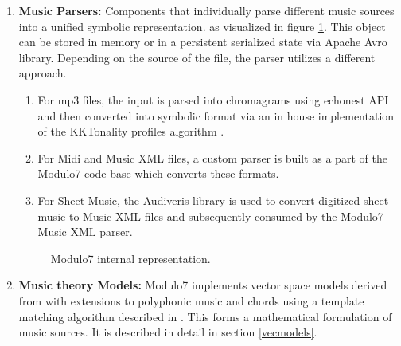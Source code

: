 \documentclass{article}
\begin{document}
\begin{enumerate}
\item \textbf{Music Parsers: } Components that individually parse different music sources into a unified symbolic representation. as visualized in figure \ref{fig:document}. This object can be stored in memory or in a persistent serialized state via Apache Avro library. Depending on the source of the file, the parser utilizes a different approach.
\begin{enumerate}
\item For mp3 files, the input is parsed into chromagrams using echonest API and then converted into symbolic format via an in house implementation of the KKTonality profiles algorithm \cite{kkTonalityKeyFinding}. 
\item For Midi and Music XML files, a custom parser is built as a part of the Modulo7 code base which converts these formats. 
\item For Sheet Music, the Audiveris library is used to convert digitized sheet music to Music XML files and subsequently consumed by the Modulo7 Music XML parser. 

\end{enumerate}

\begin{figure}[h]
\begin{center}
 {}
 \caption{Modulo7 internal representation.}
 \label{fig:document}
\end{center}
\end{figure}

\item \textbf{Music theory Models: } Modulo7 implements vector space models derived from \cite{similie} with extensions to polyphonic music and chords using a template matching algorithm described in \cite{chord-detection}. This forms a mathematical formulation of music sources. It is described in detail in section \ref{vecmodels}.


\end{enumerate}
\end{document}
